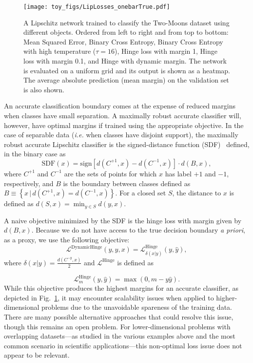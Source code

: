 \documentclass{article}
\begin{document}
\begin{figure}[h!]
    \centering
\texttt{[image: toy\_figs/LipLosses\_onebarTrue.pdf]}
    \caption{A Lipschitz network trained to classify the Two-Moons dataset using different objects. Ordered from left to right and from top to bottom: Mean Squared Error, Binary Cross Entropy, Binary Cross Entropy with high temperature
    ($\tau=16$), Hinge loss with margin 1,  Hinge loss with margin 0.1, and Hinge with dynamic margin. The network is evaluated on a uniform grid and its output is shown as a heatmap. The average absolute prediction (mean margin) on the validation set is also shown.
    }
    \label{fig:liplosses}
\end{figure}


An accurate classification boundary comes at the expense of reduced margins when classes have small separation. A maximally robust accurate classifier will, however, have optimal margins if trained using the appropriate objective. In the case of separable data (\emph{i.e.} when classes have disjoint support), the maximally robust accurate Lipschitz classifier is the signed-distance function (SDF)~\cite{manyfaces} defined, in the binary case as
\begin{equation}
    \mathrm{SDF}(x) = \mathrm{sign}\left [d(C^{+1}, x) - d(C^{-1}, x)\right ] \cdot d(B, x) ,
\end{equation}
where $C^{+1}$ and $C^{-1}$ are the sets of points for which $x$ has label $+1$ and $-1$, respectively, and $B$ is the boundary between classes defined as $B \equiv \left \{x \,\big|\, d(C^{+1}, x) = d(C^{-1}, x)\right \} $. For a closed set $S$, the distance to $x$ is defined as $d(S, x) = \min_{y\in S} d(y, x)$.

A naive objective minimized by the SDF is the hinge loss with margin given by $d(B, x)$. Because we do not have access to the true decision boundary {\em a priori}, as a proxy, we use the following objective: 
\begin{equation}
    \mathcal{L}^{\mathrm{DynamicHinge}}(y, \hat{y}, x) = \mathcal{L}^\mathrm{Hinge}_{\delta(x|y)}(y, \hat{y}),
\end{equation}
where $\delta(x|y) = \frac{d(C^{-y}, x)}{2} $ and $\mathcal{L}^\mathrm{Hinge}$ is defined as 

\begin{equation}
 \mathcal{L}^\mathrm{Hinge}_m(y, \hat{y}) = \max\left(0, m - y\hat{y}\right).
\end{equation}
While this objective produces the highest margins for an accurate classifier, as depicted in Fig.~\ref{fig:liplosses}, it may encounter scalability issues when applied to higher-dimensional problems due to the unavoidable spareness of the training data. There are many possible alternative approaches that could resolve this issue, though this remains an open problem. For lower-dimensional problems with overlapping datasets---as studied in the various examples above and the most common scenario in scientific applications---this non-optimal loss issue does not appear to be relevant.  
\end{document}
